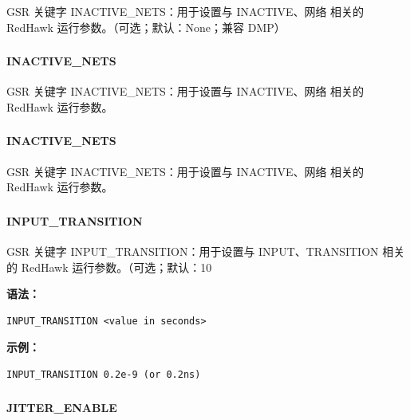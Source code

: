 GSR 关键字 INACTIVE_NETS：用于设置与 INACTIVE、网络 相关的 RedHawk 运行参数。（可选；默认：None；兼容 DMP）

\subsubsection{}
\paragraph*{INACTIVE_NETS}

GSR 关键字 INACTIVE_NETS：用于设置与 INACTIVE、网络 相关的 RedHawk 运行参数。

\subsubsection{}
\paragraph*{INACTIVE_NETS}

GSR 关键字 INACTIVE_NETS：用于设置与 INACTIVE、网络 相关的 RedHawk 运行参数。

\subsubsection{}
\paragraph*{INPUT_TRANSITION}

GSR 关键字 INPUT_TRANSITION：用于设置与 INPUT、TRANSITION 相关的 RedHawk 运行参数。（可选；默认：10%

\textbf{语法：}
\begin{lstlisting}
INPUT_TRANSITION <value in seconds>
\end{lstlisting}

\textbf{示例：}
\begin{lstlisting}
INPUT_TRANSITION 0.2e-9 (or 0.2ns)
\end{lstlisting}

\subsubsection{}
\paragraph*{JITTER_ENABLE}

